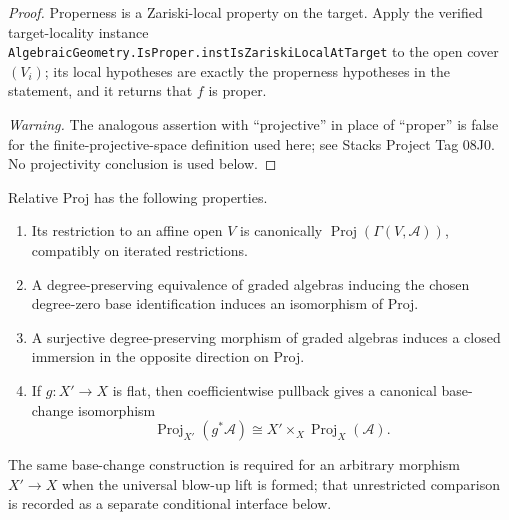 \begin{proof}
  \leanok
  Properness is a Zariski-local property on the target.  Apply the verified
  target-locality instance
  \texttt{AlgebraicGeometry.IsProper.instIsZariskiLocalAtTarget} to the open
  cover $(V_i)$; its local hypotheses are exactly the properness hypotheses in
  the statement, and it returns that $f$ is proper.

  \emph{Warning.}  The analogous assertion with ``projective'' in place of
  ``proper'' is false for the finite-projective-space definition used here;
  see Stacks Project Tag 08J0.  No projectivity conclusion is used below.
\end{proof}

\begin{proposition}
  \label{prop:nagata-relative-proj-functoriality}

  Relative Proj has the following properties.
  \begin{enumerate}
    \item Its restriction to an affine open $V$ is canonically
      $\operatorname{Proj}(\Gamma(V,\mathcal A))$, compatibly on iterated
      restrictions.
    \item A degree-preserving equivalence of graded algebras inducing the
      chosen degree-zero base identification induces an isomorphism of Proj.
    \item A surjective degree-preserving morphism of graded algebras induces
      a closed immersion in the opposite direction on Proj.
    \item If $g\colon X'\to X$ is flat, then coefficientwise pullback gives a
      canonical base-change isomorphism
      \[
        \operatorname{Proj}_{X'}(g^*\mathcal A)
          \cong X'\times_X\operatorname{Proj}_X(\mathcal A).
       \]
    \end{enumerate}
    The same base-change construction is required for an arbitrary morphism
    $X'\to X$ when the universal blow-up lift is formed; that unrestricted
    comparison is recorded as a separate conditional interface below.
\end{proposition}

